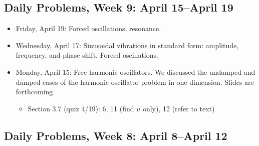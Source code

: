\subsection{Daily Problems, Week 9: April 15--April 19}
\label{dailyproblemsweek9:april15--april19}

\begin{itemize}
\item Friday, April 19: Forced oscillations, resonance.

\item Wednesday, April 17: Sinusoidal vibrations in standard form: amplitude, frequency, and phase shift. Forced oscillations.

\item Monday, April 15: Free harmonic oscillators. We discussed the undamped and damped cases of the harmonic oscillator problem in one dimension. Slides are forthcoming.

\begin{itemize}
\item Section 3.7 (quiz 4\slash 19): 6, 11 (find $ u $ only), 12 (refer to text)

\end{itemize}

\end{itemize}

\subsection{Daily Problems, Week 8: April 8--April 12}
\label{dailyproblemsweek8:april8--april12}

